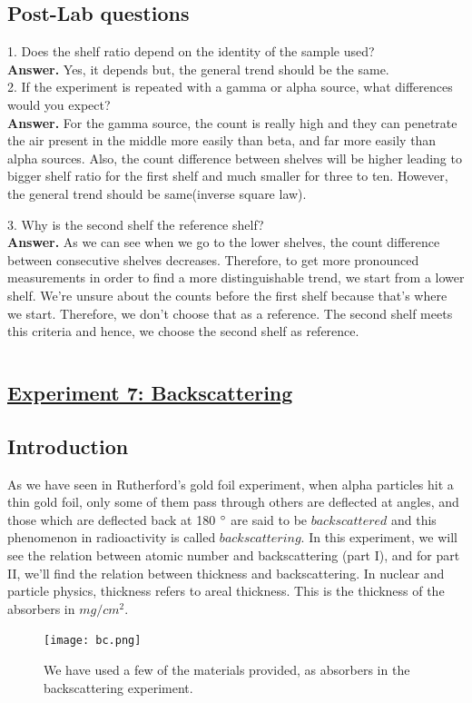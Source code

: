 \documentclass[twocolumn]{article}
\begin{document}
\subsection*{Post-Lab questions}

1. Does the shelf ratio depend on the identity of the sample used?\\
\textbf{Answer.} Yes, it depends but, the general trend should be the same.\\

2. If the experiment is repeated with a gamma or alpha source, what differences
would you expect?\\
\textbf{Answer.} For the gamma source, the count is really high and they can penetrate the air present in the middle more easily than beta, and far more easily than alpha sources. Also, the count difference between shelves will be higher leading to bigger shelf ratio for the first shelf and much smaller for three to ten. However, the general trend should be same(inverse square law).

3. Why is the second shelf the reference shelf?\\
\textbf{Answer.} As we can see when we go to the lower shelves, the count difference between consecutive shelves decreases. Therefore, to get more pronounced measurements in order to find a more distinguishable trend, we start from a lower shelf. We're unsure about the counts before the first shelf because that's where we start. Therefore, we don't choose that as a reference. The second shelf meets this criteria and hence, we choose the second shelf as reference.\\
$$$$

$$$$

\begin{center}\section*{\underline{Experiment 7: Backscattering}}\end{center}
\subsection*{Introduction}
As we have seen in Rutherford's gold foil experiment, when alpha particles hit a thin gold foil, only some of them pass through others are deflected at angles, and those which are deflected back at 180 $\degree$ are said to be $backscattered$ and this phenomenon in radioactivity is called $backscattering$. In this experiment, we will see the relation between atomic number and backscattering (part I), and for part II, we'll find the relation between thickness and backscattering. In nuclear and particle physics, thickness refers to areal thickness. This is the thickness of the absorbers in $mg/cm^2$.
\begin{center}
\begin{figure}[h!]
\texttt{[image: bc.png]}
\caption{\small{We have used a few of the materials provided, as absorbers in the backscattering experiment.}}
\end{figure}
\end{center}
\end{document}
